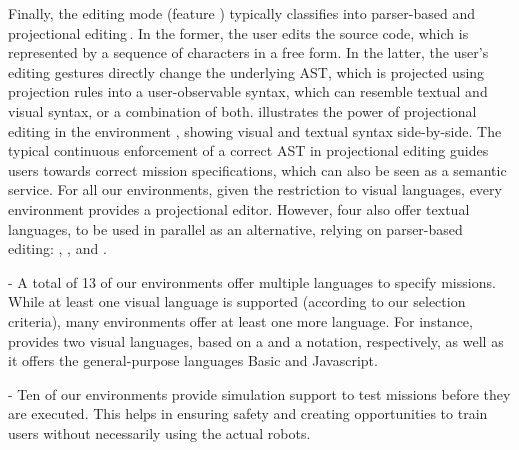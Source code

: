 Finally, the editing mode (feature \feditingmode) typically classifies into parser-based and projectional editing\,\cite{voelter2014projectional,berger2016pe}. In the former, the user edits the source code, which is represented by a sequence of characters in a free form. In the latter, the user's editing gestures directly change the underlying AST, which is projected using projection rules into a user-observable syntax, which can resemble textual and visual syntax, or a combination of both.  illustrates the power of projectional editing in the environment \easyc, showing visual and textual syntax side-by-side. The typical continuous enforcement of a correct AST in projectional editing guides users towards correct mission specifications, which can also be seen as a semantic service. For all our environments, given the restriction to visual languages, every environment provides a projectional editor. However, four also offer textual languages, to be used in parallel as an alternative, relying on parser-based editing: \aseba, \vex, \turtlebot and \robotc.

\parhead{\fmultilang} - A total of 13 of our environments offer multiple languages to specify missions. While at least one visual language is supported (according to our selection criteria), many environments offer at least one more language. For instance, \picaxe provides two visual languages, based on a \fflowchart and a \fblockly notation, respectively, as well as it offers the general-purpose languages Basic and Javascript.



\parhead{\fsimulator} - Ten of our environments provide simulation support to test missions before they are executed. This helps in ensuring safety and creating opportunities to train users without necessarily using the actual robots.

